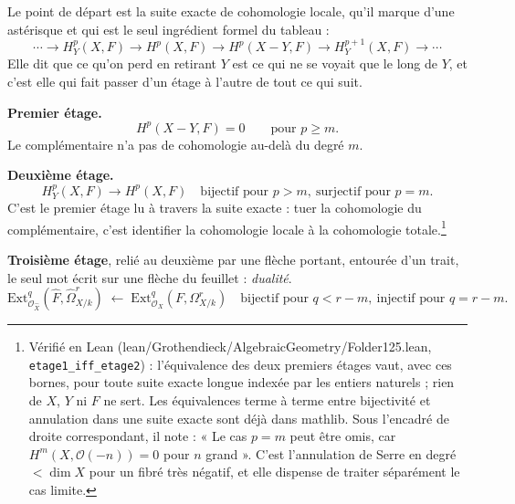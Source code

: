 \documentclass[11pt,a4paper]{article}
\begin{document}
Le point de départ est la suite exacte de cohomologie locale, qu'il marque
d'une astérisque et qui est le seul ingrédient formel du tableau :
\[
  \cdots \to H^{p}_{Y}(X, F) \to H^{p}(X, F) \to H^{p}(X - Y, F) \to
  H^{p+1}_{Y}(X, F) \to \cdots
\]
Elle dit que ce qu'on perd en retirant $Y$ est ce qui ne se voyait
que le long de $Y$, et c'est elle qui fait passer d'un étage à l'autre de tout
ce qui suit.



\textbf{Premier étage.}
\[
  H^{p}(X - Y, F) = 0 \qquad \text{pour } p \geqslant m .
\]
Le complémentaire n'a pas de cohomologie au-delà du degré $m$.

\textbf{Deuxième étage.}
\[
  H^{p}_{Y}(X, F) \longrightarrow H^{p}(X, F)
  \quad \text{bijectif pour } p > m, \ \text{surjectif pour } p = m .
\]
C'est le premier étage lu à travers la suite exacte : tuer la cohomologie du
complémentaire, c'est identifier la cohomologie locale à la cohomologie
totale.\footnote{Vérifié en Lean (lean/Grothendieck/AlgebraicGeometry/Folder125.lean,
\texttt{etage1\_iff\_etage2}) : l'équivalence des deux premiers étages vaut,
avec ces bornes, pour toute suite exacte longue indexée par les
entiers naturels ; rien de $X$, $Y$ ni $F$ ne sert. Les équivalences terme à
terme entre bijectivité et annulation dans une suite exacte sont déjà dans
mathlib. Sous l'encadré de droite correspondant, il note :
« Le cas $p = m$ peut être omis, car $H^{m}(X, \mathcal{O}(-n)) = 0$ pour $n$
grand ». C'est l'annulation de Serre en degré $< \dim X$ pour un fibré très
négatif, et elle dispense de traiter séparément le cas limite.}

\textbf{Troisième étage}, relié au deuxième par une flèche portant,
entourée d'un trait, le seul mot écrit sur une flèche du feuillet :
\emph{dualité}.
\[
  \mathrm{Ext}^{q}_{\mathcal{O}_{\widehat{X}}}\!\left(
  \widehat{F}, \widehat{\Omega}^{r}_{X/k}\right)
  \;\longleftarrow\;
  \mathrm{Ext}^{q}_{\mathcal{O}_{X}}\!\left(F, \Omega^{r}_{X/k}\right)
  \quad \text{bijectif pour } q < r - m, \ \text{injectif pour } q = r-m .
\]
\end{document}
